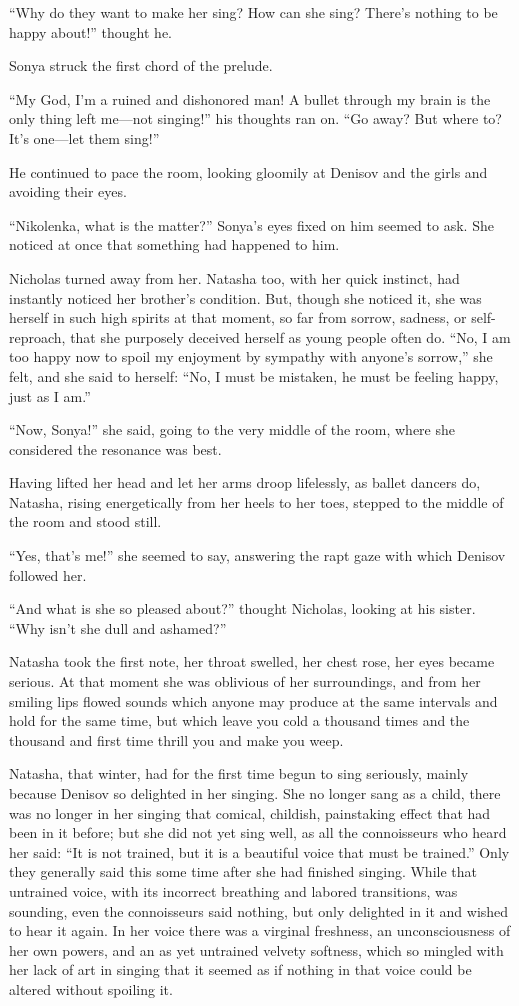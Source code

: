``Why do they want to make her sing? How can she sing? There's
nothing to be happy about!'' thought he.

Sonya struck the first chord of the prelude.

``My God, I'm a ruined and dishonored man! A bullet through my
brain is the only thing left me---not singing!'' his thoughts ran
on. ``Go away? But where to? It's one---let them sing!''

He continued to pace the room, looking gloomily at Denisov and
the girls and avoiding their eyes.

``Nikolenka, what is the matter?'' Sonya's eyes fixed on him
seemed to ask. She noticed at once that something had happened to
him.

Nicholas turned away from her. Natasha too, with her quick
instinct, had instantly noticed her brother's condition. But,
though she noticed it, she was herself in such high spirits at
that moment, so far from sorrow, sadness, or self-reproach, that
she purposely deceived herself as young people often do. ``No, I
am too happy now to spoil my enjoyment by sympathy with anyone's
sorrow,'' she felt, and she said to herself: ``No, I must be
mistaken, he must be feeling happy, just as I am.''

``Now, Sonya!'' she said, going to the very middle of the room,
where she considered the resonance was best.

Having lifted her head and let her arms droop lifelessly, as
ballet dancers do, Natasha, rising energetically from her heels
to her toes, stepped to the middle of the room and stood still.

``Yes, that's me!'' she seemed to say, answering the rapt gaze
with which Denisov followed her.

``And what is she so pleased about?'' thought Nicholas, looking
at his sister. ``Why isn't she dull and ashamed?''

Natasha took the first note, her throat swelled, her chest rose,
her eyes became serious. At that moment she was oblivious of her
surroundings, and from her smiling lips flowed sounds which
anyone may produce at the same intervals and hold for the same
time, but which leave you cold a thousand times and the thousand
and first time thrill you and make you weep.

Natasha, that winter, had for the first time begun to sing
seriously, mainly because Denisov so delighted in her
singing. She no longer sang as a child, there was no longer in
her singing that comical, childish, painstaking effect that had
been in it before; but she did not yet sing well, as all the
connoisseurs who heard her said: ``It is not trained, but it is a
beautiful voice that must be trained.'' Only they generally said
this some time after she had finished singing. While that
untrained voice, with its incorrect breathing and labored
transitions, was sounding, even the connoisseurs said nothing,
but only delighted in it and wished to hear it again. In her
voice there was a virginal freshness, an unconsciousness of her
own powers, and an as yet untrained velvety softness, which so
mingled with her lack of art in singing that it seemed as if
nothing in that voice could be altered without spoiling it.

